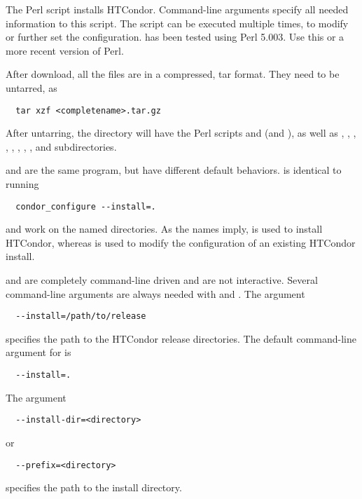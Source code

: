 
The Perl script  installs HTCondor.
Command-line arguments specify all needed information to this
script.  The script can be executed multiple times, to modify or further
set the configuration.   has been tested using Perl 5.003.
Use this or a more recent version of Perl.

After download, all the files are in a compressed, tar format.
They need to be untarred, as
\begin{verbatim}
  tar xzf <completename>.tar.gz
\end{verbatim}
After untarring, the directory will have the Perl scripts
 and  (and ), as well as 
, , , ,
, , , ,
 and  subdirectories.

 and  are the same program, but have
different default behaviors.   is identical to
running 
\begin{verbatim}
  condor_configure --install=.
\end{verbatim}
 and  work on the named directories.
As the names imply,  is used to
install HTCondor, whereas  is used to modify the
configuration of an existing HTCondor install.

 and  are completely command-line
driven and are not interactive.  Several command-line arguments are
always needed with  and .
The argument
\begin{verbatim}
  --install=/path/to/release
\end{verbatim}
specifies the path to the HTCondor release directories.
The default command-line argument for  is 
\begin{verbatim}
  --install=.
\end{verbatim}
The argument
\begin{verbatim}
  --install-dir=<directory>
\end{verbatim}
or
\begin{verbatim}
  --prefix=<directory>
\end{verbatim}
specifies the path to the install directory.


